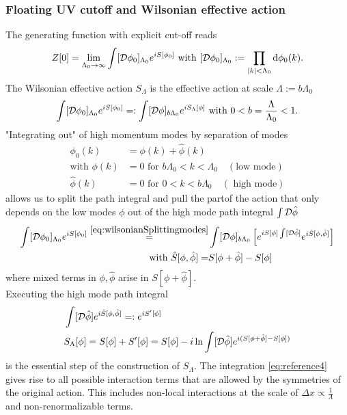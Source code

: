\subsubsection{Floating UV cutoff and Wilsonian effective action}
\begin{mybox}{}
	The generating function with explicit cut-off reads
	\begin{equation}
	Z[0] = \lim_{\Lambda_0 \rightarrow \infty} \int [\mathcal{D} \phi_0]_{\Lambda_0} e^{i S[\phi_0]} \text{ with } [\mathcal{D} \phi_0]_{\Lambda_0} := \prod_{\abs{k}<\Lambda_0} \mathrm{d} \phi_0 (k).
		\end{equation}
	The Wilsonian effective action $S_\Lambda$ is the effective action at scale $\Lambda:=b\Lambda_0$
	\begin{equation}
	\label{eq:wilsonianeffectiveaction}
		\int [\mathcal{D} \phi_0]_{\Lambda_0} e^{i S[\phi_0]} =: \int [\mathcal{D}\phi]_{b\Lambda_0} e^{iS_\Lambda[\phi]} \text{ with } 0<b=\frac{\Lambda}{\Lambda_0}<1.
	\end{equation}
	"Integrating out" of high momentum modes by separation of modes
	\begin{align}
		\phi_0(k) &= \phi(k) +\hat{ \phi}(k)\label{eq:wilsonianSplittingmodes} \\
		\text{with } \phi(k) &= 0 \text{ for } b\Lambda_0<k<\Lambda_0 \quad (\text{low mode})\\
		\hat{ \phi}(k) &= 0 \text{ for } 0<k<b\Lambda_0 \quad (\text{ high mode})
	\end{align}
allows us to split the path integral and pull the partof the action that only depends on the low modes $\phi$ out of the high mode path integral $\int \mathcal{D} \hat{ \phi}$
	\begin{align}
		\int [\mathcal{D} \phi_0]_{\Lambda_0} e^{i S[\phi_0]} \stackrel{\ref{eq:wilsonianSplittingmodes}}{=}& \int [\mathcal{D}\phi]_{b\Lambda_0}\left[e^{iS[\phi] \int [\mathcal{D} \hat{ \phi}]} e^{i \hat{S}[\phi,\hat{ \phi}]}\right]  \\
		\text{ with } \hat{S}[\phi,\hat{ \phi}] =& S[\phi+\hat{ \phi}]-S[\phi]
	\end{align}
where mixed terms in $\phi,\hat{ \phi}$ arise in $S[\phi+\hat{ \phi}]$.\\
Executing the high mode path integral
\begin{align}
	\label{eq:reference4}
&	\int [\mathcal{D} \hat{ \phi}] e^{i \hat{S}[\phi,\hat{ \phi}]} =: e^{i S^\prime[\phi]}\\
&S_\Lambda[\phi] = S[\phi] + S^\prime[\phi] = S[\phi] -i \ln \int [\mathcal{D} \hat{ \phi}] e^{i (S[\phi+\hat{ \phi} ] - S[\phi])}
\end{align}
is the essential step of the construction of $S_\Lambda$. The integration \ref{eq:reference4} gives rise to all possible interaction terms that are allowed by the symmetries of the original action. This includes non-local interactions at the scale of $\Delta x \propto \frac{1}{\Lambda}$ and non-renormalizable terms.
	
\end{mybox}
